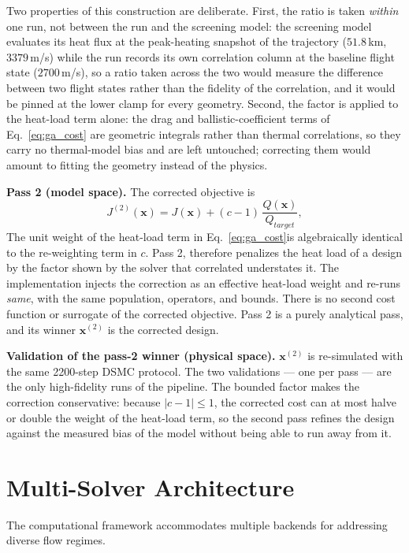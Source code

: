 Two properties of this construction are deliberate. First, the ratio is taken \emph{within} one run, not between the run and the screening model: the screening model evaluates its heat flux at the peak-heating snapshot of the trajectory ($51.8$\,km, $3379$\,m/s) while the run records its own correlation column at the baseline flight state ($2700$\,m/s), so a ratio taken across the two would measure the difference between two flight states rather than the fidelity of the correlation, and it would be pinned at the lower clamp for every geometry. Second, the factor is applied to the heat-load term alone: the drag and ballistic-coefficient terms of Eq.~\eqref{eq:ga_cost} are geometric integrals rather than thermal correlations, so they carry no thermal-model bias and are left untouched; correcting them would amount to fitting the geometry instead of the physics.

\textbf{Pass 2 (model space).} The corrected objective is
\begin{equation}
    J^{(2)}(\mathbf{x}) = J(\mathbf{x}) + (c-1)\,\frac{Q(\mathbf{x})}{Q_{target}},
    \label{eq:corrected_cost}
\end{equation}
The unit weight of the heat-load term in Eq.~\eqref{eq:ga_cost}is algebraically identical to the re-weighting term in $c$. Pass 2, therefore penalizes the heat load of a design by the factor shown by the solver that correlated understates it. The implementation injects the correction as an effective heat-load weight and re-runs \emph{same}, with the same population, operators, and bounds. There is no second cost function or surrogate of the corrected objective. Pass 2 is a purely analytical pass, and its winner $\mathbf{x}^{(2)}$ is the corrected design.

\textbf{Validation of the pass-2 winner (physical space).} $\mathbf{x}^{(2)}$ is re-simulated with the same 2200-step DSMC protocol. The two validations --- one per pass --- are the only high-fidelity runs of the pipeline. The bounded factor makes the correction conservative: because $|c-1| \leq 1$, the corrected cost can at most halve or double the weight of the heat-load term, so the second pass refines the design against the measured bias of the model without being able to run away from it.

\section{Multi-Solver Architecture}

The computational framework accommodates multiple backends for addressing diverse flow regimes.

